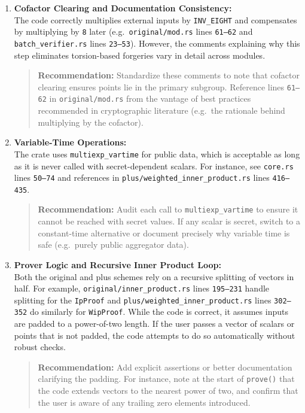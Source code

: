 \documentclass[12pt,a4paper]{article}
\begin{document}
\begin{enumerate}
    \item \textbf{Cofactor Clearing and Documentation Consistency:}\\
    The code correctly multiplies external inputs by \texttt{INV\_EIGHT} and compensates by multiplying by \texttt{8} later (e.g.\ \texttt{original/mod.rs} lines \texttt{61--62} and \texttt{batch\_verifier.rs} lines \texttt{23--53}). However, the comments explaining why this step eliminates torsion-based forgeries vary in detail across modules.
    \begin{quote}
        \textbf{Recommendation:} Standardize these comments to note that cofactor clearing ensures points lie in the primary subgroup. Reference lines \texttt{61--62} in \texttt{original/mod.rs} from the vantage of best practices recommended in cryptographic literature (e.g.\ the rationale behind multiplying by the cofactor).
    \end{quote}

    \item \textbf{Variable-Time Operations:}\\
    The crate uses \texttt{multiexp\_vartime} for public data, which is acceptable as long as it is never called with secret-dependent scalars. For instance, see \texttt{core.rs} lines \texttt{50--74} and references in \texttt{plus/weighted\_inner\_product.rs} lines \texttt{416--435}.
    \begin{quote}
        \textbf{Recommendation:} Audit each call to \texttt{multiexp\_vartime} to ensure it cannot be reached with secret values. If any scalar is secret, switch to a constant-time alternative or document precisely why variable time is safe (e.g.\ purely public aggregator data).
    \end{quote}

    \item \textbf{Prover Logic and Recursive Inner Product Loop:}\\
    Both the original and plus schemes rely on a recursive splitting of vectors in half. For example, \texttt{original/inner\_product.rs} lines \texttt{195--231} handle splitting for the \texttt{IpProof} and \texttt{plus/weighted\_inner\_product.rs} lines \texttt{302--352} do similarly for \texttt{WipProof}. While the code is correct, it assumes inputs are padded to a power-of-two length. If the user passes a vector of scalars or points that is not padded, the code attempts to do so automatically without robust checks.
    \begin{quote}
        \textbf{Recommendation:} Add explicit assertions or better documentation clarifying the padding. For instance, note at the start of \texttt{prove()} that the code extends vectors to the nearest power of two, and confirm that the user is aware of any trailing zero elements introduced.
    \end{quote}
\end{enumerate}
\end{document}
